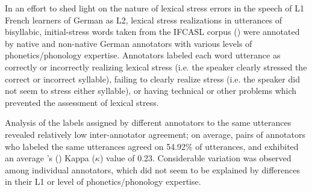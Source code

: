 \documentclass[11pt,a4paper,onecolumn]{article}
\newcommand{\TODO}[1]{{\color{red}\textbf{[TODO #1]}}}
\begin{document}
In an effort to shed light on the nature of lexical stress errors in the speech of L1 French learners of German as L2, 
	lexical stress realizations in utterances of bisyllabic, initial-stress words %
	taken from the IFCASL corpus (\cite{Trouvain2013,Fauth2014}) %
	were annotated by native and non-native German annotators with various levels of phonetics/phonology expertise. %
	Annotators %
	labeled each word utterance
	as correctly or incorrectly realizing lexical stress (i.e. the speaker clearly stressed the correct or incorrect syllable), failing to clearly realize stress (i.e. the speaker did not seem to stress either syllable), or having technical or other problems which prevented the assessment of lexical stress.  %
	
	Analysis of the labels assigned by different annotators to the same utterances %
	revealed relatively low inter-annotator agreement; %
	on average, pairs of annotators who labeled the same utterances agreed on 54.92\% of utterances, and exhibited an average \citeauthor{Cohen1960}'s (\citeyear{Cohen1960}) Kappa ($\kappa$) value of 0.23.
	Considerable variation was observed among individual annotators, %
	which did not seem to be explained by differences 
	in their L1 %
	or level of phonetics/phonology expertise. %
	
\end{document}
